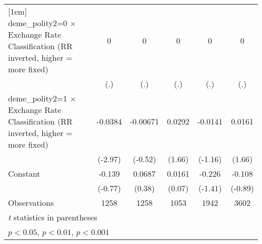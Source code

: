 {\begin{tabular}{l*{5}{c}}
[1em]
deme\_polity2=0 $\times$ Exchange Rate Classification (RR inverted, higher = more fixed)&        0         &        0         &        0         &        0         &        0         \\
                &      (.)         &      (.)         &      (.)         &      (.)         &      (.)         \\
[1em]
deme\_polity2=1 $\times$ Exchange Rate Classification (RR inverted, higher = more fixed)&  -0.0384\sym{**} & -0.00671         &   0.0292         &  -0.0141         &   0.0161         \\
                &  (-2.97)         &  (-0.52)         &   (1.66)         &  (-1.16)         &   (1.66)         \\
[1em]
Constant        &   -0.139         &   0.0687         &   0.0161         &   -0.226         &   -0.108         \\
                &  (-0.77)         &   (0.38)         &   (0.07)         &  (-1.41)         &  (-0.89)         \\
\hline
Observations    &     1258         &     1258         &     1053         &     1942         &     3602         \\
\hline\hline
\multicolumn{6}{l}{\footnotesize \textit{t} statistics in parentheses}\\
\multicolumn{6}{l}{\footnotesize \sym{*} \(p<0.05\), \sym{**} \(p<0.01\), \sym{***} \(p<0.001\)}\\
\end{tabular}
}

